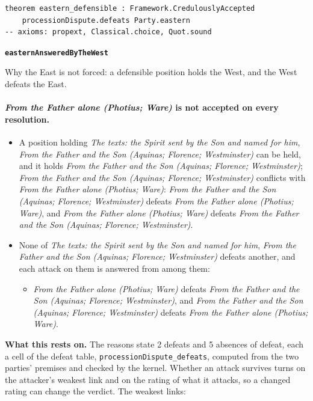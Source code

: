 \documentclass[11pt,paper=\testimonypaper,DIV=13,parskip=false]{scrartcl}
\begin{document}
{\small\begin{verbatim}
theorem eastern_defensible : Framework.CredulouslyAccepted
    processionDispute.defeats Party.eastern
-- axioms: propext, Classical.choice, Quot.sound
\end{verbatim}}
\par\medskip\noindent\textbf{\texttt{eastern\allowbreak{}Answered\allowbreak{}By\allowbreak{}The\allowbreak{}West}}\par\nobreak\noindent
Why the East is not forced: a defensible position holds the West, and the West defeats the East.

\paragraph{\emph{From the Father alone (Photius; Ware)} is not accepted on every resolution.}
\begin{itemize}
\item A position holding \emph{The texts: the Spirit sent by the Son and named for him}, \emph{From the Father and the Son (Aquinas; Florence; Westminster)} can be held, and it holds \emph{From the Father and the Son (Aquinas; Florence; Westminster)}; \emph{From the Father and the Son (Aquinas; Florence; Westminster)} conflicts with \emph{From the Father alone (Photius; Ware)}: \emph{From the Father and the Son (Aquinas; Florence; Westminster)} defeats \emph{From the Father alone (Photius; Ware)}, and \emph{From the Father alone (Photius; Ware)} defeats \emph{From the Father and the Son (Aquinas; Florence; Westminster)}.
\item None of \emph{The texts: the Spirit sent by the Son and named for him}, \emph{From the Father and the Son (Aquinas; Florence; Westminster)} defeats another, and each attack on them is answered from among them:
\begin{itemize}
\item \emph{From the Father alone (Photius; Ware)} defeats \emph{From the Father and the Son (Aquinas; Florence; Westminster)}, and \emph{From the Father and the Son (Aquinas; Florence; Westminster)} defeats \emph{From the Father alone (Photius; Ware)}.
\end{itemize}
\end{itemize}
\par\noindent\textbf{What this rests on.} The reasons state 2 defeats and 5 absences of defeat, each a cell of the defeat table, \texttt{procession\allowbreak{}Dispute\_\allowbreak{}defeats}, computed from the two parties' premises and checked by the kernel. Whether an attack survives turns on the attacker's weakest link and on the rating of what it attacks, so a changed rating can change the verdict. The weakest links:
\end{document}

